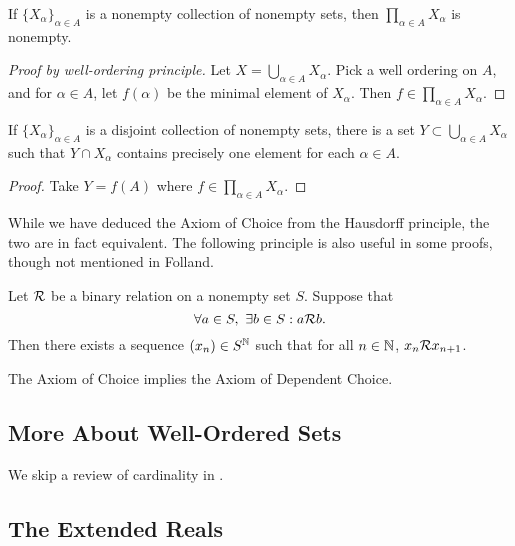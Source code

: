 \documentclass[12pt]{article} %
\begin{document}
\begin{principle}
    If $\{X_\alpha\}_{\alpha \in A}$ is a nonempty collection of nonempty sets, then $\prod_{\alpha \in A} X_\alpha$ is nonempty.
\end{principle}

\begin{proof}[Proof by well-ordering principle]
    Let $X = \bigcup_{\alpha \in A} X_\alpha$. Pick a well ordering on $A$, and for $\alpha \in A$, let $f(\alpha)$ be the minimal element of $X_\alpha$. Then $f \in \prod_{\alpha \in A} X_\alpha$.
\end{proof}

\begin{corollary}
    If $\{X_\alpha\}_{\alpha \in A}$ is a disjoint collection of nonempty sets, there is a set $Y \subset \bigcup_{\alpha \in A} X_\alpha$ such that $Y \cap X_\alpha$ contains precisely one element for each $\alpha \in A$.
\end{corollary}

\begin{proof}
    Take $Y = f(A)$ where $f \in \prod_{\alpha \in A} X_\alpha$.
\end{proof}

\noindent While we have deduced the Axiom of Choice from the Hausdorff principle, the two are in fact equivalent. The following principle is also useful in some proofs, though not mentioned in Folland.

\begin{principle}
    Let $\mathcal{R}$ be a binary relation on a nonempty set $S$. Suppose that \[\forall a \in S, \ \exists b \in S : a \mathcal{R} b.\] Then there exists a sequence $(x_n) \in S^{\mathbb{N}}$ such that for all $n \in \mathbb{N}$, $x_n \mathcal{R} x_{n+1}$.
\end{principle}

\begin{proposition}
    The Axiom of Choice implies the Axiom of Dependent Choice.
\end{proposition}

\subsection{More About Well-Ordered Sets}

We skip a review of cardinality in \citet{folland1999real}. 

\subsection{The Extended Reals}
\end{document}
